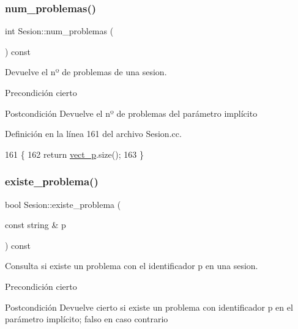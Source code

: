 \subsubsection{\texorpdfstring{num\+\_\+problemas()}{num\_problemas()}}
{\footnotesize\ttfamily int Sesion\+::num\+\_\+problemas (\begin{DoxyParamCaption}{ }\end{DoxyParamCaption}) const}



Devuelve el nº de problemas de una sesion. 

\begin{DoxyPrecond}{Precondición}
cierto 
\end{DoxyPrecond}
\begin{DoxyPostcond}{Postcondición}
Devuelve el nº de problemas del parámetro implícito 
\end{DoxyPostcond}


Definición en la línea 161 del archivo Sesion.\+cc.


\begin{DoxyCode}
161                                       \{
162         \textcolor{keywordflow}{return} \mbox{\hyperlink{class_sesion_ab9459a157fdb5e1c2f975ba20305ae8f}{vect\_p}}.size();
163       \}
\end{DoxyCode}
\mbox{\label{class_sesion_a5b175e13592d600ccc17a80789735382}} 
\subsubsection{\texorpdfstring{existe\+\_\+problema()}{existe\_problema()}}
{\footnotesize\ttfamily bool Sesion\+::existe\+\_\+problema (\begin{DoxyParamCaption}\item[{const string \&}]{p }\end{DoxyParamCaption}) const}



Consulta si existe un problema con el identificador p en una sesion. 

\begin{DoxyPrecond}{Precondición}
cierto 
\end{DoxyPrecond}
\begin{DoxyPostcond}{Postcondición}
Devuelve cierto si existe un problema con identificador p en el parámetro implícito; falso en caso contrario 
\end{DoxyPostcond}



